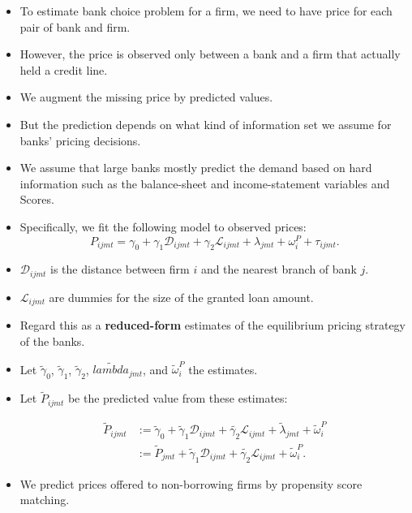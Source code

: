 \documentclass[]{book}
\providecommand{\tightlist}{%
  \setlength{\itemsep}{0pt}\setlength{\parskip}{0pt}}
\begin{document}
\begin{itemize}
\tightlist
\item
  To estimate bank choice problem for a firm, we need to have price for
  each pair of bank and firm.
\item
  However, the price is observed only between a bank and a firm that
  actually held a credit line.
\item
  We augment the missing price by predicted values.
\item
  But the prediction depends on what kind of information set we assume
  for banks' pricing decisions.
\item
  We assume that large banks mostly predict the demand based on hard
  information such as the balance-sheet and income-statement variables
  and Scores.
\item
  Specifically, we fit the following model to observed prices: \[
  P_{ijmt} = \gamma_0 + \gamma_1 \mathcal{D}_{ijmt} + \gamma_2 \mathcal{L}_{ijmt} + \lambda_{jmt} + \omega_i^P + \tau_{ijmt}.
  \]
\item
  \(\mathcal{D}_{ijmt}\) is the distance between firm \(i\) and the
  nearest branch of bank \(j\).
\item
  \(\mathcal{L}_{ijmt}\) are dummies for the size of the granted loan
  amount.
\item
  Regard this as a \textbf{reduced-form} estimates of the equilibrium
  pricing strategy of the banks.
\item
  Let \(\tilde{\gamma}_0\), \(\tilde{\gamma}_1\), \(\tilde{\gamma}_2\),
  \(\tilde{lambda}_{jmt}\), and \(\tilde{\omega}_i^P\) the estimates.
\item
  Let \(\tilde{P}_{ijmt}\) be the predicted value from these estimates:

  \begin{equation}
  \begin{split}
  \tilde{P}_{ijmt} &:= \tilde{\gamma}_0 + \tilde{\gamma}_1 \mathcal{D}_{ijmt} + \tilde{\gamma_2} \mathcal{L}_{ijmt} + \tilde{\lambda}_{jmt} + \tilde{\omega}_i^P\\
  &:= \tilde{P}_{jmt} + \tilde{\gamma}_1 \mathcal{D}_{ijmt} + \tilde{\gamma_2} \mathcal{L}_{ijmt} + \tilde{\omega}_i^P.
  \end{split} \label{eq:price-predicted}
  \end{equation}
\item
  We predict prices offered to non-borrowing firms by propensity score
  matching.
\end{itemize}
\end{document}
